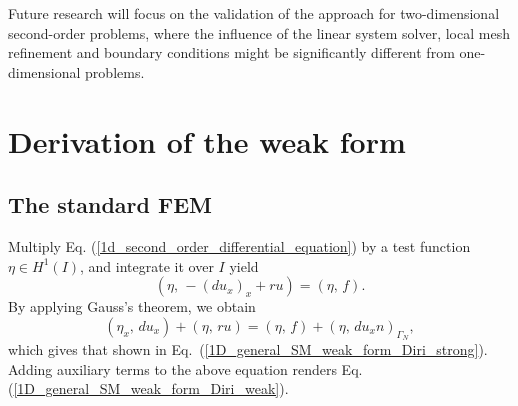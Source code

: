 \documentclass[review,3p]{elsarticle}
\begin{document}
Future research will focus on the validation of the approach for two-dimensional second-order problems, where the influence of the linear system solver, local mesh refinement and boundary conditions might be significantly different from one-dimensional problems. 

\appendix

\section{Derivation of the weak form}		\label{weak form appendix}

\subsection{The standard FEM}		\label{derivation_weak_form_SM}

Multiply Eq. (\ref{1d_second_order_differential_equation}) by a test function $\eta \in H ^1 (I)$, and integrate it over $I$ yield
\begin{equation}
(\eta, \, -\left(d u_x \right)_x + ru) = (\eta, \, f). \label{1D_general_inte}
\end{equation}
By applying Gauss's theorem, we obtain
\begin{equation}
 ({\eta} _x, \, d u_x) + (\eta, \, ru) = (\eta, \, f) + \left( \eta, \, d u_x n \right)_{ {\Gamma_N}},		\label{1D_general_gauss}
\end{equation}
which gives that shown in Eq.~({\ref{1D_general_SM_weak_form_Diri_strong}}). Adding auxiliary terms to the above equation renders Eq. (\ref{1D_general_SM_weak_form_Diri_weak}).
\end{document}
